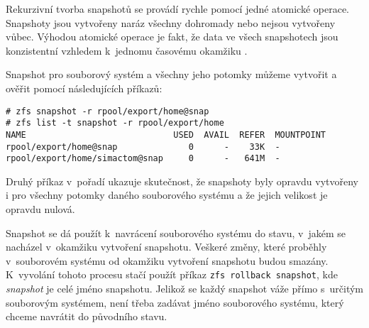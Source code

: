 Rekurzivní tvorba snapshotů se provádí rychle pomocí jedné atomické operace. Snapshoty jsou vytvořeny naráz všechny dohromady nebo nejsou vytvořeny vůbec. Výhodou atomické operace je fakt, že data ve všech snapshotech jsou konzistentní vzhledem k~jednomu časovému okamžiku \cite{snapshot}.

Snapshot pro souborový systém a všechny jeho potomky můžeme vytvořit a ověřit pomocí následujících příkazů:
\begin{verbatim}
# zfs snapshot -r rpool/export/home@snap
# zfs list -t snapshot -r rpool/export/home
NAME                             USED  AVAIL  REFER  MOUNTPOINT
rpool/export/home@snap              0      -    33K  -
rpool/export/home/simactom@snap     0      -   641M  -
\end{verbatim}
Druhý příkaz v~pořadí ukazuje skutečnost, že snapshoty byly opravdu vytvořeny i pro všechny potomky daného souborového systému a že jejich velikost je opravdu nulová.

Snapshot se dá použít k~navrácení souborového systému do stavu, v~jakém se nacházel v~okamžiku vytvoření snapshotu. Veškeré změny, které proběhly v~souborovém systému od okamžiku vytvoření snapshotu budou smazány. K~vyvolání tohoto procesu stačí použít příkaz \verb|zfs rollback snapshot|, kde \emph{snapshot} je celé jméno snapshotu. Jelikož se každý snapshot váže přímo s~určitým souborovým systémem, není třeba zadávat jméno souborového systému, který chceme navrátit do původního stavu. 